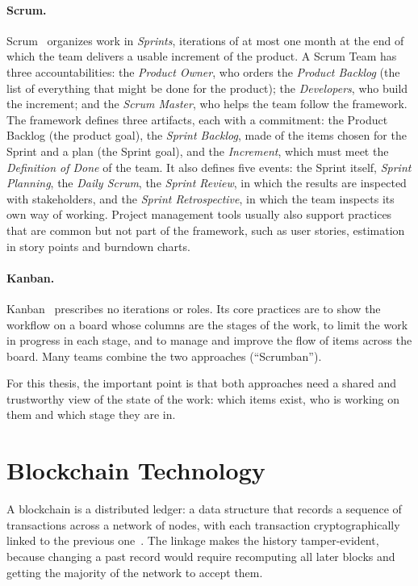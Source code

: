 \paragraph*{Scrum.} Scrum~\cite{scrumguide2020} organizes work in \emph{Sprints}, iterations of at most one month at the end of which the team delivers a usable increment of the product. A Scrum Team has three accountabilities: the \emph{Product Owner}, who orders the \emph{Product Backlog} (the list of everything that might be done for the product); the \emph{Developers}, who build the increment; and the \emph{Scrum Master}, who helps the team follow the framework. The framework defines three artifacts, each with a commitment: the Product Backlog (the product goal), the \emph{Sprint Backlog}, made of the items chosen for the Sprint and a plan (the Sprint goal), and the \emph{Increment}, which must meet the \emph{Definition of Done} of the team. It also defines five events: the Sprint itself, \emph{Sprint Planning}, the \emph{Daily Scrum}, the \emph{Sprint Review}, in which the results are inspected with stakeholders, and the \emph{Sprint Retrospective}, in which the team inspects its own way of working. Project management tools usually also support practices that are common but not part of the framework, such as user stories, estimation in story points and burndown charts.

\paragraph*{Kanban.} Kanban~\cite{anderson2010kanban} prescribes no iterations or roles. Its core practices are to show the workflow on a board whose columns are the stages of the work, to limit the work in progress in each stage, and to manage and improve the flow of items across the board. Many teams combine the two approaches (``Scrumban'').

For this thesis, the important point is that both approaches need a shared and trustworthy view of the state of the work: which items exist, who is working on them and which stage they are in.

\section{Blockchain Technology}
\label{sec:blockchain}

A blockchain is a distributed ledger: a data structure that records a sequence of transactions across a network of nodes, with each transaction cryptographically linked to the previous one~\cite{nakamoto2008bitcoin}. The linkage makes the history tamper-evident, because changing a past record would require recomputing all later blocks and getting the majority of the network to accept them.

